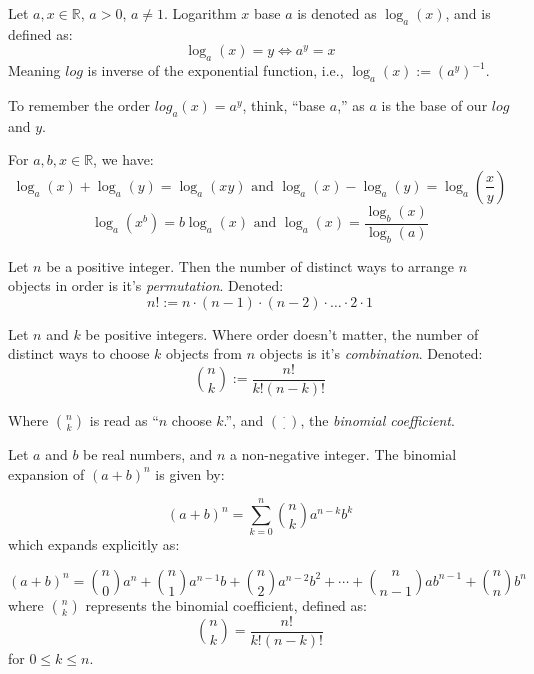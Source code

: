 \begin{Def}[Logarithm]

    Let $a,x\in\mathbb{R}$, $a>0$, $a\neq 1$. Logarithm $x$ base $a$ is denoted as $\log_a(x)$, and is defined as:
    \Large
    \[\log_a(x)=y\Longleftrightarrow a^y=x\]
    \normalsize
    Meaning $log$ is inverse of the exponential function, i.e., $\log_a(x):=(a^y)^{-1}$.
\end{Def}
\begin{Tip}
    To remember the order $log_a(x)=a^y$, think, ``base $a$,'' as $a$ is the base of our $log$ and $y$.
\end{Tip}

\begin{theo}

    \label{thm:logrules}
    
    For $a,b,x\in\mathbb{R}$, we have:
    \Large
    \[\log_a(x)+\log_a(y)=\log_a(xy) \text{ and } \log_a(x)-\log_a(y)=\log_a\left(\dfrac{x}{y}\right)\]
    \[\log_a(x^b)=b\log_a(x) \text{ and } \log_a(x)=\dfrac{\log_b(x)}{\log_b(a)}\]
    \normalsize
\end{theo}

\newpage

\begin{Def}[Permutations]
    
        Let $n$ be a positive integer. Then the number of distinct ways to arrange $n$ objects in order is it's \textit{ permutation}. Denoted:
        \Large
        \[n!:=n\cdot(n-1)\cdot(n-2)\cdot\ldots\cdot2\cdot1\]
        \normalsize
\end{Def}

\begin{Def}[Combinations]

    Let $n$ and $k$ be positive integers. Where order doesn't matter, the number of distinct ways to choose $k$ objects from $n$ objects is it's \textit{combination}. Denoted:
    \Large
    \[\binom{n}{k}:=\dfrac{n!}{k!(n-k)!}\]
    \normalsize

    \noindent
    Where $\binom{n}{k}$ is read as ``$n$ choose $k$.'', and $\binom{\cdot}{\cdot}$, the \textit{binomial coefficient}.
    
\end{Def}

\begin{theo}

    \label{thm:binomial}
    
    Let \(a\) and \(b\) be real numbers, and \(n\) a non-negative integer. The binomial expansion of \((a + b)^n\) is given by:
    
    \[
    (a + b)^n = \sum_{k=0}^{n} \binom{n}{k} a^{n-k} b^k
    \]
    which expands explicitly as:
    
    \[
    (a + b)^n = \binom{n}{0} a^n + \binom{n}{1} a^{n-1}b + \binom{n}{2} a^{n-2}b^2 + \cdots + \binom{n}{n-1} a b^{n-1} + \binom{n}{n} b^n
    \]
    \noindent
    where \(\binom{n}{k}\) represents the binomial coefficient, defined as:
    \Large
    \[
    \binom{n}{k} = \frac{n!}{k!(n-k)!}
    \]
    \normalsize
    for \(0 \leq k \leq n\).

\end{theo}

